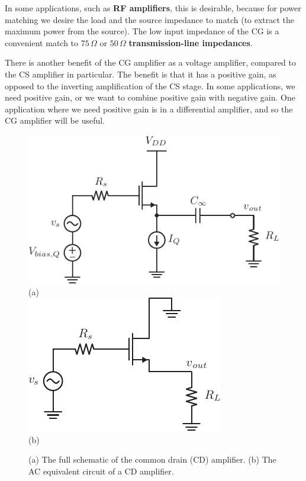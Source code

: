 In some applications, such as \textbf{RF amplifiers}, this is desirable, because for power matching we desire the load and the source impedance to match (to extract the maximum power from the source).  The low input impedance of the CG is a convenient match to $75\,\Omega$ or $50\,\Omega$ \textbf{transmission-line impedances}.

There is another benefit of the CG amplifier as a voltage amplifier, compared to the CS amplifier in particular.  The benefit is that it has a positive gain, as opposed to the inverting amplification of the CS stage.  In some applications, we need positive gain, or we want to combine positive gain with negative gain.  One application where we need positive gain is in a differential amplifier, and so the CG amplifier will be useful.
\newpage
\begin{figure}[t]
\centering
\includegraphics[scale=1.15]{cd_amp_dc}\\
(a)\\[0.15cm]
\includegraphics[scale=1.25]{cd_amp_ac}\\
(b)\\
\caption{(a) The full schematic of the common drain (CD) amplifier.  (b) The AC equivalent circuit of a CD amplifier.}
\label{fig:cd_amp_dc_ac}
\end{figure}
